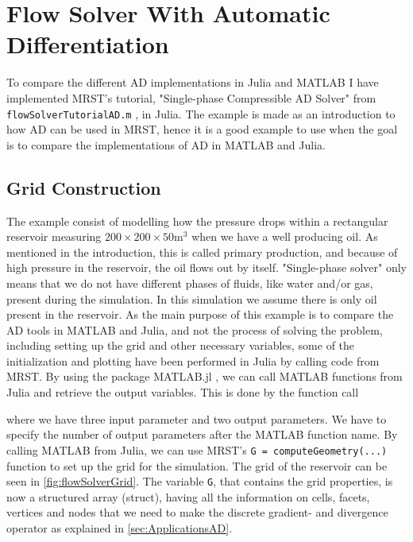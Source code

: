 \chapter{Flow Solver With Automatic Differentiation}
\label{ch:FlowSolver}
To compare the different AD implementations in Julia and MATLAB I have implemented MRST's tutorial, "Single-phase Compressible AD Solver" from \texttt{flowSolverTutorialAD.m} \emph{\citep{flowSolverADExample}}, in Julia. The example is made as an introduction to how AD can be used in MRST, hence it is a good example to use when the goal is to compare the implementations of AD in MATLAB and Julia. 

\section{Grid Construction}
\label{sec:GridConstruction}
The example consist of modelling how the pressure drops within a rectangular reservoir measuring $200\times 200 \times 50 \text{m}^3$ when we have a well producing oil. As mentioned in the introduction, this is called primary production, and because of high pressure in the reservoir, the oil flows out by itself. "Single-phase solver" only means that we do not have different phases of fluids, like water and/or gas, present during the simulation. In this simulation we assume there is only oil present in the reservoir. As the main purpose of this example is to compare the AD tools in MATLAB and Julia, and not the process of solving the problem, including setting up the grid and other necessary variables, some of the initialization and plotting have been performed in Julia by calling code from MRST. By using the package MATLAB.jl \emph{\citep{MATLAB.jl}}, we can call MATLAB functions from Julia and retrieve the output variables. This is done by the function call

where we have three input parameter and two output parameters. We have to specify the number of output parameters after the MATLAB function name.  By calling MATLAB from Julia, we can use MRST's \texttt{G = computeGeometry(...)} function to set up the grid for the simulation. The grid of the reservoir can be seen in \autoref{fig:flowSolverGrid}. The variable \texttt{G}, that contains the grid properties, is now a structured array (struct), having all the information on cells, facets, vertices and nodes that we need to make the discrete gradient- and divergence operator as explained in \autoref{sec:ApplicationsAD}. 

